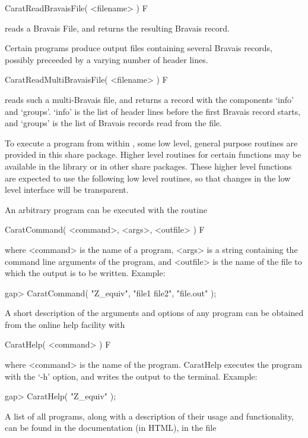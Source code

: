 \>CaratReadBravaisFile( <filename> ) F

reads a Bravais File, and returns the resulting Bravais record.

Certain {\CARAT} programs produce output files containing several Bravais 
records, possibly preceeded by a varying number of header lines.

\>CaratReadMultiBravaisFile( <filename> ) F

reads such a multi-Bravais file, and returns a record with the components
`info' and `groups'. `info' is the list of header lines before the first
Bravais record starts, and `groups' is the list of Bravais records read from
the file.


To execute a {\CARAT} program from within {\GAP}, some low level,
general purpose routines are provided in this share package. 
Higher level routines for certain {\CARAT} functions may be available 
in the {\GAP} library or in other share packages. These higher
level functions are expected to use the following low level routines,
so that changes in the low level interface will be transparent. 

An arbitrary {\CARAT} program can be executed with the routine

\>CaratCommand( <command>, <args>, <outfile> ) F

where <command> is the name of a {\CARAT} program, <args> is a string
containing the command line arguments of the {\CARAT} program,
and <outfile> is the name of the file to which the output is to be 
written. Example:

\beginexample
    gap> CaratCommand( "Z_equiv", "file1 file2", "file.out" );
\endexample

A short description of the arguments and options of any {\CARAT} 
program can be obtained from the {\CARAT} online help facility with

\>CaratHelp( <command> ) F

where <command> is the name of the {\CARAT} program. CaratHelp executes
the program with the `-h' option, and writes the output to the 
terminal. Example:

\beginexample
    gap> CaratHelp( "Z_equiv" );
\endexample

A list of all {\CARAT} programs, along with a description of their
usage and functionality, can be found in the {\CARAT} documentation 
(in HTML), in the file

